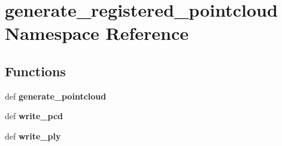 \section{generate\-\_\-registered\-\_\-pointcloud \-Namespace \-Reference}
\label{namespacegenerate__registered__pointcloud}
\subsection*{\-Functions}
\begin{DoxyCompactItemize}
\item 
def {\bf generate\-\_\-pointcloud}
\item 
def {\bf write\-\_\-pcd}
\item 
def {\bf write\-\_\-ply}
\end{DoxyCompactItemize}
